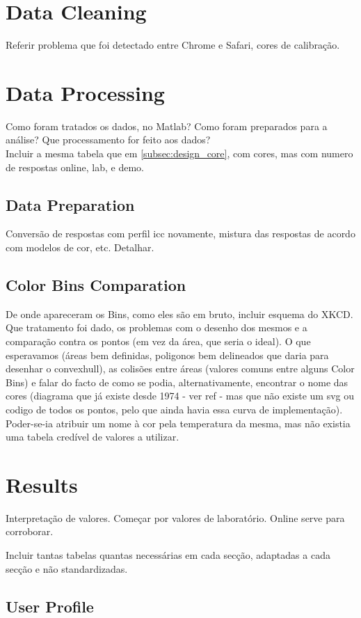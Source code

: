 \section{Data Cleaning}
\label{sec:results_datacleaning}
%
Referir problema que foi detectado entre Chrome e Safari, cores de calibração.
%
\section{Data Processing}
\label{sec:results_digest}
%
Como foram tratados os dados, no Matlab? Como foram preparados para a análise?
Que processamento for feito aos dados? \\
Incluir a mesma tabela que em \ref{subsec:design_core}, com cores, mas com numero de respostas online, lab, e demo.
%
\subsection{Data Preparation}
\label{subsec:results_preparation}
%
Conversão de respostas com perfil icc novamente, mistura das respostas de acordo com modelos de cor, etc.
Detalhar.
%
\subsection{Color Bins Comparation}
\label{subsec:results_preparation}
%
De onde apareceram os Bins, como eles são em bruto, incluir esquema do XKCD. Que tratamento foi dado, os problemas
com o desenho dos mesmos e a comparação contra os pontos (em vez da área, que seria o ideal). O que esperavamos
(áreas bem definidas, poligonos bem delineados que daria para desenhar o convexhull), as colisões entre áreas (valores
comuns entre alguns Color Bins) e falar do facto de como se podia, alternativamente, encontrar o nome das cores (diagrama
que já existe desde 1974 - ver ref - mas que não existe um svg ou codigo de todos os pontos, pelo que ainda havia essa curva
de implementação). Poder-se-ia atribuir um nome à cor pela temperatura da mesma, mas não existia uma tabela credível de valores
a utilizar.
%
\section{Results}
\label{sec:results_results}
%
Interpretação de valores. Começar por valores de laboratório. Online serve para corroborar. \par
Incluir tantas tabelas quantas necessárias em cada secção, adaptadas a cada secção e não standardizadas.
%
\subsection{User Profile}
\label{subsec:results_userprofile}
%
